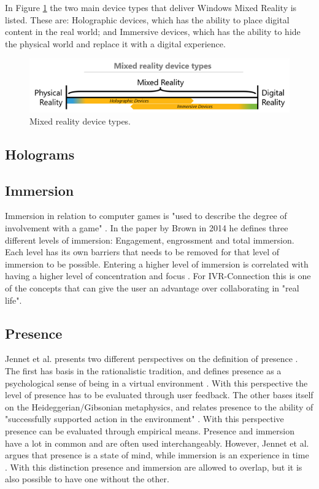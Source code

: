     In Figure \ref{fig:mrdevicetypes} the two main device types that deliver Windows Mixed Reality is listed. These are: Holographic devices, which has the ability to place digital content in the real world;\cite{wdc-mr} and Immersive devices, which has the ability to hide the physical world and replace it with a digital experience.\cite{wdc-mr} 
    \begin{figure}[!ht]
        \centering
        \includegraphics[scale=1]{figures/mixedrealityspectrumdevicetypes.png}
        \caption{Mixed reality device types.\cite{wdc-mr}}
        \label{fig:mrdevicetypes}
    \end{figure}
    
    \subsection{Holograms}
    
    \subsection{Immersion} %
    Immersion in relation to computer games is "used to describe the degree of involvement with a game" \cite{Brown2004}. In the paper by Brown in 2014 he defines three different levels of immersion: Engagement, engrossment and total immersion. Each level has its own barriers that needs to be removed for that level of immersion to be possible. Entering a higher level of immersion is correlated with having a higher level of concentration and focus \cite{Jennett2008}. For IVR-Connection this is one of the concepts that can give the user an advantage over collaborating in "real life".
    
    \subsection{Presence} %
    Jennet et al. presents two different perspectives on the definition of presence \cite{Jennett2008}. The first has basis in the rationalistic tradition, and defines presence as a psychological sense of being in a virtual environment \cite{Slater1994}. With this perspective the level of presence has to be evaluated through user feedback. The other bases itself on the Heideggerian/Gibsonian metaphysics, and relates presence to the ability of "successfully supported action in the environment" \cite{Zahorik1998}. With this perspective presence can be evaluated through empirical means. Presence and immersion have a lot in common and are often used interchangeably. However, Jennet et al. argues that presence is a state of mind, while immersion is an experience in time \cite{Jennett2008}. With this distinction presence and immersion are allowed to overlap, but it is also possible to have one without the other.
    
